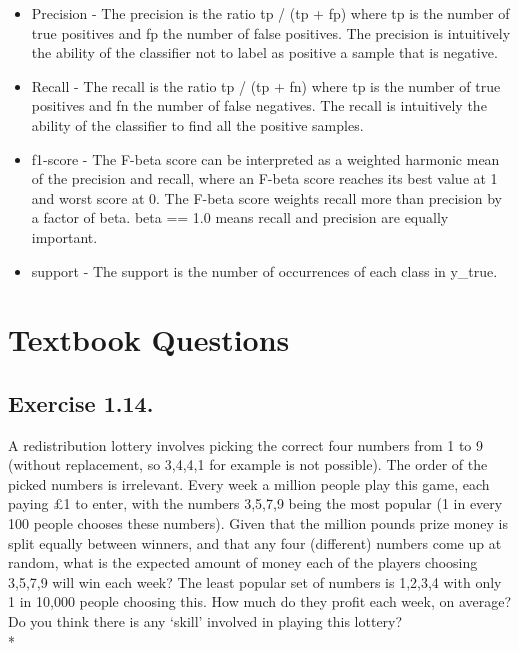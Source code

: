 \documentclass[11pt]{article}
\def\br{\hspace*{\fill} \\* }
\begin{document}
\begin{itemize}
\item
Precision - The precision is the ratio tp / (tp + fp) where tp is the
number of true positives and fp the number of false positives. The
precision is intuitively the ability of the classifier not to label as
positive a sample that is negative.

\item
Recall - The recall is the ratio tp / (tp + fn) where tp is the number
of true positives and fn the number of false negatives. The recall is
intuitively the ability of the classifier to find all the positive
samples.

\item
f1-score - The F-beta score can be interpreted as a weighted harmonic
mean of the precision and recall, where an F-beta score reaches its best
value at 1 and worst score at 0. The F-beta score weights recall more than precision by a factor of
  beta. beta == 1.0 means recall and precision are equally important.

\item
support - The support is the number of occurrences of each class in
y\_true.

\end{itemize}


    \section{Textbook Questions}

\subsection*{Exercise 1.14.}

A redistribution lottery involves picking the correct four numbers from
1 to 9 (without replacement, so 3,4,4,1 for example is not possible).
The order of the picked numbers is irrelevant. Every week a million
people play this game, each paying £1 to enter, with the numbers 3,5,7,9
being the most popular (1 in every 100 people chooses these numbers).
Given that the million pounds prize money is split equally between
winners, and that any four (different) numbers come up at random, what
is the expected amount of money each of the players choosing 3,5,7,9
will win each week? The least popular set of numbers is 1,2,3,4 with
only 1 in 10,000 people choosing this. How much do they profit each
week, on average? Do you think there is any `skill' involved in playing
this lottery?\br
\end{document}
